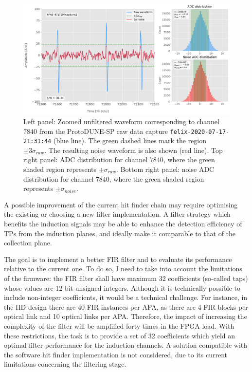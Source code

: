 \begin{figure}[t]
	\centering
	\includegraphics[width=1\linewidth]{Images/Matched_Filter/waveform_example_raw}
	\caption[Example unfiltered waveform from a ProtoDUNE-SP raw data capture.]{Left panel: Zoomed unfiltered waveform corresponding to channel $7840$ from the ProtoDUNE-SP raw data capture \texttt{felix-2020-07-17-21:31:44} (blue line). The green dashed lines mark the region $\pm3\sigma_{raw}$. The resulting noise waveform is also shown (red line). Top right panel: ADC distribution for channel $7840$, where the green shaded region represents $\pm \sigma_{raw}$. Bottom right panel: noise ADC distribution for channel $7840$, where the green shaded region represents $\pm \sigma_{noise}$.}
	\label{fig:adcs_nofir}
\end{figure}

A possible improvement of the current hit finder chain may require optimising the existing or choosing a new filter implementation. A filter strategy which benefits the induction signals may be able to enhance the detection efficiency of TPs from the induction planes, and ideally make it comparable to that of the collection plane.  

The goal is to implement a better FIR filter and to evaluate its performance relative to the current one. To do so, I need to take into account the limitations of the firmware: the FIR filter shall have maximum 32 coefficients (so-called taps) whose values are 12-bit unsigned integers. Although it is technically possible to include non-integer coefficients, it would be a technical challenge. For instance, in the HD design there are 40 FIR instances per APA, as there are 4 FIR blocks per optical link and 10 optical links per APA. Therefore, the impact of increasing the complexity of the filter will be amplified forty times in the FPGA load. With these restrictions, the task is to provide a set of 32 coefficients which yield an optimal filter performance for the induction channels. A solution compatible with the software hit finder implementation is not considered, due to its current limitations concerning the filtering stage.

